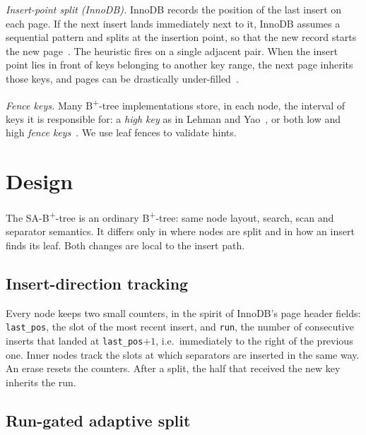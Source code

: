 \documentclass[conference]{IEEEtran}
\newcommand{\sab}{SA-B\textsuperscript{+}-tree}
\newcommand{\bp}{B\textsuperscript{+}-tree}
\begin{document}
\emph{Insert-point split (InnoDB).} InnoDB records the position of the last
insert on each page. If the next insert lands immediately next to it, InnoDB
assumes a sequential pattern and splits at the insertion point, so that the new
record starts the new page~\cite{percona2017}. The heuristic fires on a
single adjacent pair. When the insert point lies in front of keys belonging
to another key range, the next page inherits those keys, and pages can be
drastically under-filled~\cite{mysql67718}.

\emph{Fence keys.} Many \bp{} implementations store, in each node, the
interval of keys it is responsible for: a \emph{high key} as in
Lehman and Yao~\cite{lehman1981}, or both low and high \emph{fence
keys}~\cite{graefe2011}. We use leaf fences to validate hints.

\section{Design}
\label{sec:design}

The \sab{} is an ordinary \bp{}: same node layout, search, scan and
separator semantics. It differs only in where nodes are split and in how an
insert finds its leaf. Both changes are local to the insert path.

\subsection{Insert-direction tracking}
Every node keeps two small counters, in the spirit of InnoDB's page header
fields: \texttt{last\_pos}, the slot of the most recent insert, and
\texttt{run}, the number of consecutive inserts that landed at
\texttt{last\_pos}$+1$, i.e.\ immediately to the right of the previous one.
Inner nodes track the slots at which separators are inserted in the same way.
An erase resets the counters. After a split, the half that received the new
key inherits the run.

\subsection{Run-gated adaptive split}
\label{sec:split}
\end{document}
